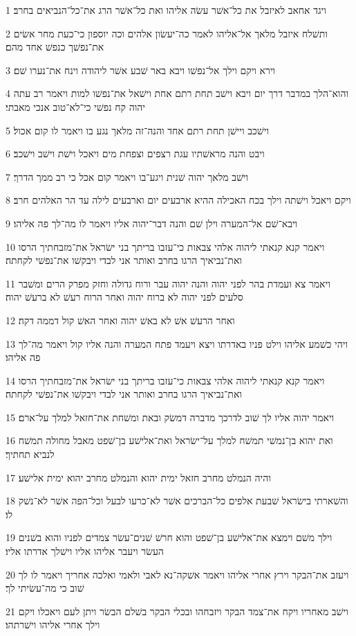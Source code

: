 \par 1 ויגד אחאב לאיזבל את כל־אשׁר עשׂה אליהו ואת כל־אשׁר הרג את־כל־הנביאים בחרב׃
\par 2 ותשׁלח איזבל מלאך אל־אליהו לאמר כה־יעשׂון אלהים וכה יוספון כי־כעת מחר אשׂים את־נפשׁך כנפשׁ אחד מהם׃
\par 3 וירא ויקם וילך אל־נפשׁו ויבא באר שׁבע אשׁר ליהודה וינח את־נערו שׁם׃
\par 4 והוא־הלך במדבר דרך יום ויבא וישׁב תחת רתם אחת וישׁאל את־נפשׁו למות ויאמר רב עתה יהוה קח נפשׁי כי־לא־טוב אנכי מאבתי׃
\par 5 וישׁכב ויישׁן תחת רתם אחד והנה־זה מלאך נגע בו ויאמר לו קום אכול׃
\par 6 ויבט והנה מראשׁתיו עגת רצפים וצפחת מים ויאכל וישׁת וישׁב וישׁכב׃
\par 7 וישׁב מלאך יהוה שׁנית ויגע־בו ויאמר קום אכל כי רב ממך הדרך׃
\par 8 ויקם ויאכל וישׁתה וילך בכח האכילה ההיא ארבעים יום וארבעים לילה עד הר האלהים חרב׃
\par 9 ויבא־שׁם אל־המערה וילן שׁם והנה דבר־יהוה אליו ויאמר לו מה־לך פה אליהו׃
\par 10 ויאמר קנא קנאתי ליהוה אלהי צבאות כי־עזבו בריתך בני ישׂראל את־מזבחתיך הרסו ואת־נביאיך הרגו בחרב ואותר אני לבדי ויבקשׁו את־נפשׁי לקחתה׃
\par 11 ויאמר צא ועמדת בהר לפני יהוה והנה יהוה עבר ורוח גדולה וחזק מפרק הרים ומשׁבר סלעים לפני יהוה לא ברוח יהוה ואחר הרוח רעשׁ לא ברעשׁ יהוה׃
\par 12 ואחר הרעשׁ אשׁ לא באשׁ יהוה ואחר האשׁ קול דממה דקה׃
\par 13 ויהי כשׁמע אליהו וילט פניו באדרתו ויצא ויעמד פתח המערה והנה אליו קול ויאמר מה־לך פה אליהו׃
\par 14 ויאמר קנא קנאתי ליהוה אלהי צבאות כי־עזבו בריתך בני ישׂראל את־מזבחתיך הרסו ואת־נביאיך הרגו בחרב ואותר אני לבדי ויבקשׁו את־נפשׁי לקחתה׃
\par 15 ויאמר יהוה אליו לך שׁוב לדרכך מדברה דמשׂק ובאת ומשׁחת את־חזאל למלך על־ארם׃
\par 16 ואת יהוא בן־נמשׁי תמשׁח למלך על־ישׂראל ואת־אלישׁע בן־שׁפט מאבל מחולה תמשׁח לנביא תחתיך׃
\par 17 והיה הנמלט מחרב חזאל ימית יהוא והנמלט מחרב יהוא ימית אלישׁע׃
\par 18 והשׁארתי בישׂראל שׁבעת אלפים כל־הברכים אשׁר לא־כרעו לבעל וכל־הפה אשׁר לא־נשׁק לו׃
\par 19 וילך משׁם וימצא את־אלישׁע בן־שׁפט והוא חרשׁ שׁנים־עשׂר צמדים לפניו והוא בשׁנים העשׂר ויעבר אליהו אליו וישׁלך אדרתו אליו׃
\par 20 ויעזב את־הבקר וירץ אחרי אליהו ויאמר אשׁקה־נא לאבי ולאמי ואלכה אחריך ויאמר לו לך שׁוב כי מה־עשׂיתי לך׃
\par 21 וישׁב מאחריו ויקח את־צמד הבקר ויזבחהו ובכלי הבקר בשׁלם הבשׂר ויתן לעם ויאכלו ויקם וילך אחרי אליהו וישׁרתהו׃

